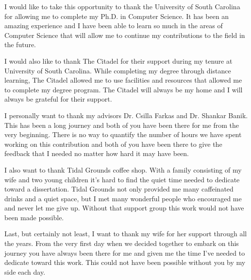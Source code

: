 I would like to take this opportunity to thank the University of South Carolina for allowing me to complete my Ph.D. in Computer Science. It has been an amazing experience and I have been able to learn so much in the areas of Computer Science that will allow me to continue my contributions to the field in the future.

I would also like to thank The Citadel for their support during my tenure at University of South Carolina. While completing my degree through distance learning, The Citadel allowed me to use facilities and resources that allowed me to complete my degree program. The Citadel will always be my home and I will always be grateful for their support.

I personally want to thank my advisors Dr. Csilla Farkas and Dr. Shankar Banik. This has been a long journey and both of you have been there for me from the very beginning. There is no way to quantify the number of hours we have spent working on this contribution and both of you have been there to give the feedback that I needed no matter how hard it may have been.

I also want to thank Tidal Grounds coffee shop. With a family consisting of my wife and two young children it's hard to find the quiet time needed to dedicate toward a dissertation. Tidal Grounds not only provided me many caffeinated drinks and a quiet space, but I met many wonderful people who encouraged me and never let me give up. Without that support group this work would not have been made possible.

Last, but certainly not least, I want to thank my wife for her support through all the years. From the very first day when we decided together to embark on this journey you have always been there for me and given me the time I've needed to dedicate toward this work. This could not have been possible without you by my side each day.